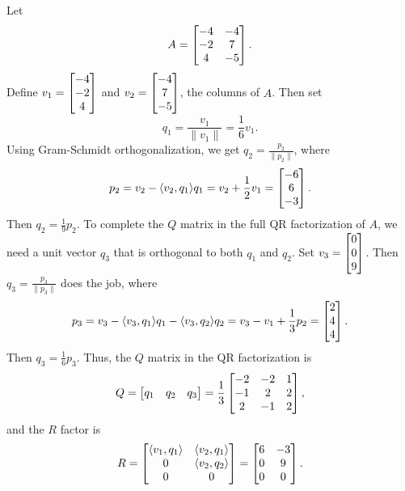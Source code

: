 \documentclass{homework}
\begin{document}
\begin{alphaparts}
		\questionpart  Let
		\begin{equation*}
			A = \left[\begin{matrix}-4 & -4 \\-2 & 7 \\ 4 & -5\end{matrix}\right].
		\end{equation*}
		Define $v_1 = \left[\begin{matrix}-4\\-2\\4\end{matrix}\right]$ and $v_2 = \left[\begin{matrix}-4 \\ 7 \\ -5\end{matrix}\right]$, the columns of $A$. Then set
		\begin{equation*}
			q_1 = \frac{v_1}{\lVert{v_1}\rVert} = \frac{1}{6}v_1.
		\end{equation*}
		Using Gram-Schmidt orthogonalization, we get $q_2 = \frac{p_2}{\lVert p_2\rVert}$, where
		\begin{equation*}
			p_2 = v_2 - \langle v_2, q_1\rangle q_1 = v_2 + \frac{1}{2}v_1 = \left[\begin{matrix}-6 \\ 6 \\ -3\end{matrix}\right].
		\end{equation*}
		Then $q_2 = \frac{1}{9}p_2$. To complete the $Q$ matrix in the full QR factorization of $A$, we need a unit vector $q_3$ that is orthogonal to both $q_1$ and $q_2$. Set $v_3 = \left[\begin{matrix}0\\0\\9\end{matrix}\right]$. Then $q_3 = \frac{p_3}{\lVert p_3\rVert}$ does the job, where
		\begin{equation*}
			p_3 = v_3 - \langle v_3, q_1\rangle q_1 - \langle v_3, q_2\rangle q_2 = v_3 - v_1 + \frac{1}{3}p_2 = \left[\begin{matrix}2 \\ 4 \\ 4\end{matrix}\right].
		\end{equation*}
		Then $q_3 = \frac{1}{6}p_3$. Thus, the $Q$ matrix in the QR factorization is
		\begin{equation*}
			Q = \left[\begin{matrix}q_1 & q_2 & q_3\end{matrix}\right] = \frac{1}{3}\left[\begin{matrix}-2 & -2 & 1 \\ -1 & 2 & 2 \\ 2 & -1 & 2\end{matrix}\right],
		\end{equation*}
		and the $R$ factor is
		\begin{equation*}
			R = \left[\begin{matrix}\langle v_1, q_1 \rangle & \langle v_2, q_1 \rangle \\ 0 & \langle v_2, q_2 \rangle \\ 0 & 0\end{matrix}\right] = \left[\begin{matrix}6 & -3 \\ 0 & 9 \\0 & 0\end{matrix}\right].
		\end{equation*}
	\end{alphaparts}
	
\end{document}

